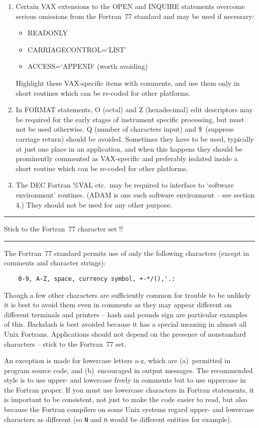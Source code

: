\documentclass[twoside,11pt]{article}
\newcounter{sruleno}
\newcommand{\srule}[1]{
    \addtocounter{sruleno}{1}
    \goodbreak
    \rule[0.5ex]{\textwidth}{0.3mm}
    {\Large #1 \hfill {\thesruleno}}
    \rule[0.5ex]{\textwidth}{0.1mm}
}
\newcommand{\srule}[1]{
       \addtocounter{sruleno}{1}
       \begin{rawhtml} <HR> \end{rawhtml}
       {\Large \thesruleno}~~~~{\Large #1}
       \begin{rawhtml} <HR> \end{rawhtml}
       \end{tabular}
  }
\renewcommand{\_}{{\tt\char'137}}
\begin{document}
\begin{enumerate}
\item Certain VAX extensions to the OPEN and INQUIRE statements
overcome serious
omissions from the Fortran~77 standard and may be used if necessary:
\begin{itemize}
\item READONLY
\item CARRIAGECONTROL=`LIST'
\item ACCESS=`APPEND' (worth avoiding)
\end{itemize}
Highlight these
VAX-specific items with comments, and use them only in short routines
which can be re-coded for other platforms.

\item In FORMAT statements, O (octal) and Z (hexadecimal) edit descriptors may
be required for the early stages of instrument specific processing, but must not
be used otherwise.  Q (number of characters input) and \$\ (suppress
carriage return) should be avoided.  Sometimes they have to be
used, typically at just one place in an application, and when this
happens they should be prominently commented as VAX-specific and
preferably isolated inside a short routine which can be re-coded
for other platforms.

\item The DEC Fortran \%VAL etc.\ may be required to interface to `software
environment' routines.
(ADAM is one such software environment -- see section 4.)
They should not be used for any other purpose.

\end{enumerate}

\srule{Stick to the Fortran~77 character set !!}
The Fortran~77 standard permits use of only the following characters
(except in comments and character strings):
\begin{verbatim}
    0-9, A-Z, space, currency symbol, +-*/(),'.:
\end{verbatim}
Though a few other characters are sufficiently common for trouble to be unlikely
it is best to avoid them even in comments as they may appear different on
different terminals and printers -- hash and pounds sign are particular
examples of this.  Backslash is best avoided because it has a special
meaning in almost all Unix Fortrans.
Applications should not depend on the presence of nonstandard characters --
stick to the Fortran~77 set.

An exception is made for lowercase letters
a-z, which are (a)~permitted in program
source code, and (b)~encouraged in output messages.
The recommended style is to use upper- and lowercase
freely in comments but to use uppercase in the Fortran proper.
If you must use lowercase characters in Fortran statements, it is
important to be consistent, not just to make the code easier to read,
but also because the Fortran compilers on some Unix systems regard
upper- and lowercase characters as different (so \verb|N| and \verb|n|
would be different entities for example).
\end{document}
